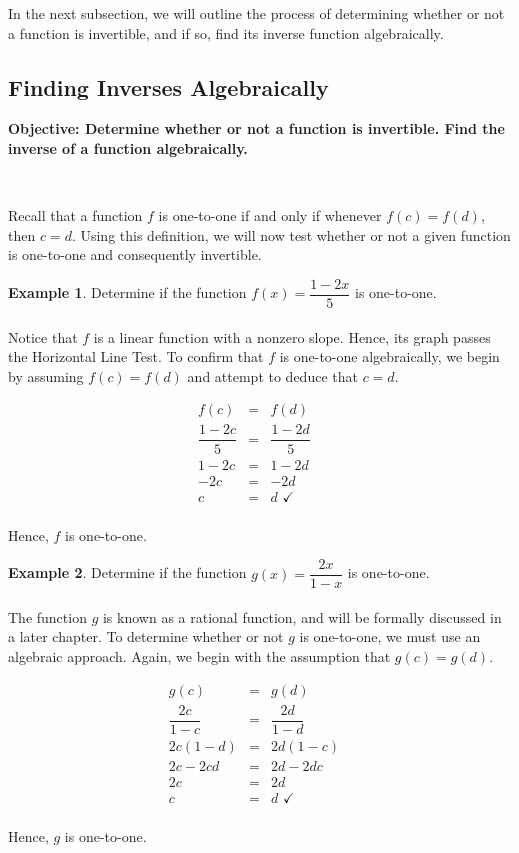 \documentclass[11pt]{book}
\newcommand{\tmstrong}[1]{\textbf{#1}}
\theoremstyle{definition}  %
\newtheorem{example}{Example}[chapter]
\newcommand{\pp}{\par~\par}
\begin{document}
In the next subsection, we will outline the process of determining whether or not a function is invertible, and if so, find its inverse function algebraically.

\newpage

\subsection{Finding Inverses Algebraically}

{\tmstrong{Objective: Determine whether or not a function is invertible.  Find the inverse of a function algebraically.}}\pp

Recall that a function $f$ is one-to-one if and only if whenever $f(c) = f(d)$, then $c=d$.  Using this definition, we will now test whether or not a given function is one-to-one and consequently invertible.

\begin{example} Determine if the function $f(x) = \dfrac{1-2x}{5}$ is one-to-one.\\
~\\
Notice that $f$ is a linear function with a nonzero slope.  Hence, its graph passes the Horizontal Line Test.  To confirm that $f$ is one-to-one algebraically, we begin by assuming $f(c) = f(d)$ and attempt to deduce that $c=d$. 

\[ \begin{array}{rclr}

f(c) & = & f(d) & \\ [3pt]
\dfrac{1-2c}{5} & = & \dfrac{1-2d}{5} & \\ [5pt]
1-2c & = & 1-2d & \\
-2c & = & -2d & \\
c & = & d \, \, \checkmark & \\

\end{array} \]

Hence, $f$ is one-to-one.
\end{example}


\begin{example} Determine if the function $g(x) = \dfrac{2x}{1-x}$ is one-to-one.\\
~\\
The function $g$ is known as a rational function, and will be formally discussed in a later chapter.  To determine whether or not $g$ is one-to-one, we must use an algebraic approach.  Again, we begin with the assumption that $g(c) = g(d)$.

\[ \begin{array}{rclr}
g(c) & = & g(d) & \\ [3pt]
\dfrac{2c}{1-c} & = & \dfrac{2d}{1-d} & \\ [6pt]
2c(1-d) & = & 2d(1-c) & \\
2c - 2cd & = & 2d - 2dc & \\
2c & = & 2d & \\
c & = & d \, \, \checkmark \\ 
\end{array} \]

Hence, $g$ is one-to-one.  
\end{example}
\end{document}
